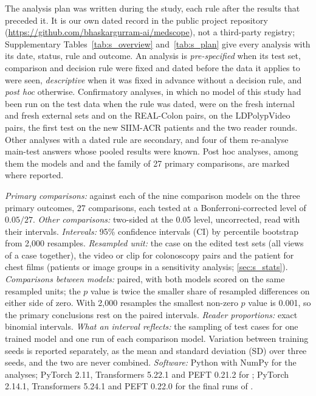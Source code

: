 The analysis plan was written during the study, each rule after the results that preceded it. It is our own dated record in the public project repository (\url{https://github.com/bhaskargurram-ai/medscope}), not a third-party registry; Supplementary Tables~\ref{tab:s_overview} and~\ref{tab:s_plan} give every analysis with its date, status, rule and outcome. An analysis is \emph{pre-specified} when its test set, comparison and decision rule were fixed and dated before the data it applies to were seen, \emph{descriptive} when it was fixed in advance without a decision rule, and \emph{post hoc} otherwise. Confirmatory analyses, in which no model of this study had been run on the test data when the rule was dated, were \ms{} on the fresh internal and fresh external sets and on the REAL-Colon pairs, \msn{} on the LDPolypVideo pairs, the first test on the new SIIM-ACR patients and the two reader rounds. Other analyses with a dated rule are secondary, and four of them re-analyse main-test answers whose pooled results were known. Post hoc analyses, among them the models \msp{} and \msn{} and the family of 27 primary comparisons, are marked where reported.

\emph{Primary comparisons:} \ms{} against each of the nine comparison models on the three primary outcomes, 27 comparisons, each tested at a Bonferroni-corrected level of $0.05/27$. \emph{Other comparisons:} two-sided at the 0.05 level, uncorrected, read with their intervals. \emph{Intervals:} 95\% confidence intervals (CI) by percentile bootstrap from 2,000 resamples. \emph{Resampled unit:} the case on the edited test sets (all views of a case together), the video or clip for colonoscopy pairs and the patient for chest films (patients or image groups in a sensitivity analysis; \ref{sec:s_stats}). \emph{Comparisons between models:} paired, with both models scored on the same resampled units; the $p$ value is twice the smaller share of resampled differences on either side of zero. With 2,000 resamples the smallest non-zero $p$ value is 0.001, so the primary conclusions rest on the paired intervals. \emph{Reader proportions:} exact binomial intervals. \emph{What an interval reflects:} the sampling of test cases for one trained model and one run of each comparison model. Variation between training seeds is reported separately, as the mean and standard deviation (SD) over three seeds, and the two are never combined. \emph{Software:} Python with NumPy for the analyses; PyTorch 2.11, Transformers 5.22.1 and PEFT 0.21.2 for \ms; PyTorch 2.14.1, Transformers 5.24.1 and PEFT 0.22.0 for the final runs of \msn.
